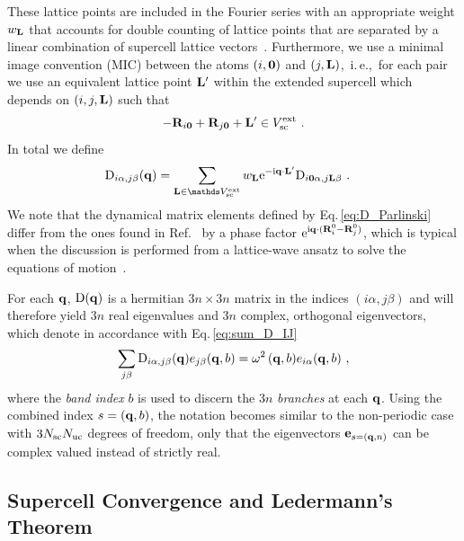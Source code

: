 These lattice points are included in the Fourier series with an appropriate weight $w_{{\bf L}}$ that accounts for double counting of lattice points that are separated by a linear combination of supercell lattice vectors~\cite{Parlinski1997}. Furthermore, we use a minimal image convention (MIC) between the atoms $(i, {\bf 0})$ and $(j, {\bf L})$,~i.\,e.,~for each pair we use an equivalent lattice point ${\bf L}'$ within the extended supercell which depends on $(i, j, {\bf L})$ such that
\begin{align}
	- \b R_{i \b 0 } + \b R_{j \b 0} + \b L' \in V_{\rm sc}^{\rm ext}~.
	\label{eq:L'}
\end{align}
In total we define
\begin{align}
	{\rm D}_{i \alpha, j \beta} (\b q) 	
		&= %
		\sum_{\b L \in \mathds V_{\rm sc}^{\rm ext}} 
			w_{\b L}
		{\rm e}^{- \im \b q \cdot \b L'} {\rm D}_{i \b 0 \alpha, j \b L \beta}~.
	\label{eq:D_Parlinski}
\end{align}
We note that the dynamical matrix elements defined by Eq.\,\eqref{eq:D_Parlinski} differ from the ones found in Ref.~\cite{Parlinski1997} by a phase factor ${\rm e}^{{\rm i} {\bf q} \cdot ({\bf R}_i^0 - {\bf R}_j^0)}$, which is typical when the discussion is performed from a lattice-wave ansatz to solve the equations of motion~\cite[p. 298]{BornHuang}.

For each ${\bf q}$, ${\rm D} ({\bf q})$ is a hermitian $3n \times 3n$ matrix in the indices $(i \alpha, j \beta)$ and will therefore yield $3n$ real eigenvalues and $3n$ complex, orthogonal eigenvectors, which denote in accordance with Eq.\,\eqref{eq:sum_D_IJ}
\begin{align}
\sum_{j \beta} {\rm D}_{i \alpha, j \beta} (\b q) e_{j \beta} (\b q , b)
= \omega^2 \, (\b q, b) e_{i \alpha} (\b q , b)~,
\label{eq:D_ij(q)w}
\end{align}
where the \emph{band index} $b$ is used to discern the $3n$ \emph{branches} at each ${\bf q}$. Using the combined index $s = ({\bf q}, b)$, the notation becomes similar to the non-periodic case with $3N_{\rm sc} N_{\rm uc}$ degrees of freedom, only that the eigenvectors ${\bf e}_{s = ({\bf q}, n)}$ can be complex valued instead of strictly real.

\subsection{Supercell Convergence and Ledermann's Theorem}


